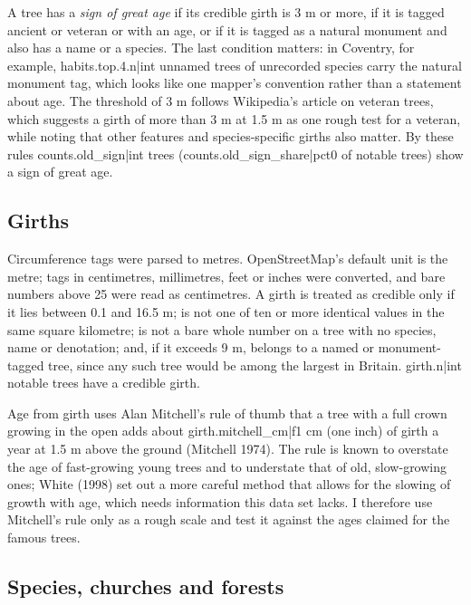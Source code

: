 \documentclass[11pt,a4paper]{article}
\begin{document}
A tree has a \emph{sign of great age} if its credible girth is 3 m or more, if it is tagged ancient or veteran or with an age, or if it is tagged as a natural monument and also has a name or a species. The last condition matters: in Coventry, for example, {{habits.top.4.n|int}} unnamed trees of unrecorded species carry the natural monument tag, which looks like one mapper's convention rather than a statement about age. The threshold of 3 m follows Wikipedia's article on veteran trees, which suggests a girth of more than 3 m at 1.5 m as one rough test for a veteran, while noting that other features and species-specific girths also matter. By these rules {{counts.old_sign|int}} trees ({{counts.old_sign_share|pct0}} of notable trees) show a sign of great age.

\subsection{Girths}

Circumference tags were parsed to metres. OpenStreetMap's default unit is the metre; tags in centimetres, millimetres, feet or inches were converted, and bare numbers above 25 were read as centimetres. A girth is treated as credible only if it lies between 0.1 and 16.5 m; is not one of ten or more identical values in the same square kilometre; is not a bare whole number on a tree with no species, name or denotation; and, if it exceeds 9 m, belongs to a named or monument-tagged tree, since any such tree would be among the largest in Britain. {{girth.n|int}} notable trees have a credible girth.

Age from girth uses Alan Mitchell's rule of thumb that a tree with a full crown growing in the open adds about {{girth.mitchell_cm|f1}} cm (one inch) of girth a year at 1.5 m above the ground (Mitchell 1974). The rule is known to overstate the age of fast-growing young trees and to understate that of old, slow-growing ones; White (1998) set out a more careful method that allows for the slowing of growth with age, which needs information this data set lacks. I therefore use Mitchell's rule only as a rough scale and test it against the ages claimed for the famous trees.

\subsection{Species, churches and forests}
\end{document}
